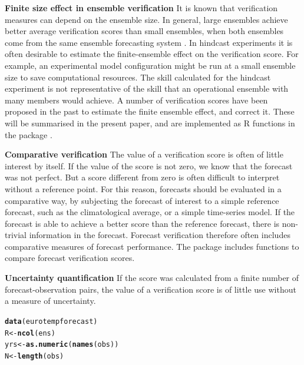 \documentclass[article]{jss}\usepackage{graphicx, color}
\makeatletter
\newcommand{\hlfunctioncall}[1]{\textcolor[rgb]{0,0.501960784313725,0.752941176470588}{\textbf{#1}}}%
\newenvironment{kframe}{%
 \def\at@end@of@kframe{}%
 \ifinner\ifhmode%
  \def\at@end@of@kframe{\end{minipage}}%
  \begin{minipage}{\columnwidth}%
 \fi\fi%
 \def\FrameCommand##1{\hskip\@totalleftmargin \hskip-\fboxsep
 \colorbox{shadecolor}{##1}\hskip-\fboxsep
     \hskip-\linewidth \hskip-\@totalleftmargin \hskip\columnwidth}%
 \MakeFramed {\advance\hsize-\width
   \@totalleftmargin\z@ \linewidth\hsize
   \@setminipage}}%
 {\par\unskip\endMakeFramed%
 \at@end@of@kframe}
\newenvironment{knitrout}{}{} %
\makeatother
\begin{document}
{\bf Finite size effect in ensemble verification}
It is known that verification measures can depend on the ensemble size.
In general, large ensembles achieve better average verification scores than small ensembles, when both ensembles come from the same ensemble forecasting system \citep{buizza1998impact}.
In hindcast experiments it is often desirable to estimate the finite-ensemble effect on the verification score. 
For example, an experimental model configuration might be run at a small ensemble size to save computational resources. 
The skill calculated for the hindcast experiment is not representative of the skill that an operational ensemble with many members would achieve.
A number of verification scores have been proposed in the past to estimate the finite ensemble effect, and correct it.
These will be summarised in the present paper, and are implemented as R functions in the package .


{\bf Comparative verification}
The value of a verification score is often of little interest by itself.
If the value of the score is not zero, we know that the forecast was not perfect.
But a score different from zero is often difficult to interpret without a reference point.
For this reason, forecasts should be evaluated in a comparative way, by subjecting the forecast of interest to a simple reference forecast, such as the climatological average, or a simple time-series model.
If the forecast is able to achieve a better score than the reference forecast, there is non-trivial information in the forecast.
Forecast verification therefore often includes comparative measures of forecast performance.
The package  includes functions to compare forecast verification scores.


{\bf Uncertainty quantification}
If the score was calculated from a finite number of forecast-observation pairs,  the value of a verification score is of little use without a measure of uncertainty.





\begin{knitrout}
\color{fgcolor}\begin{kframe}
\begin{alltt}
\hlfunctioncall{data}(eurotempforecast)
R   <- \hlfunctioncall{ncol}(ens)
yrs <- \hlfunctioncall{as.numeric}(\hlfunctioncall{names}(obs))
N   <- \hlfunctioncall{length}(obs)
\end{alltt}
\end{kframe}
\end{knitrout}
\end{document}
